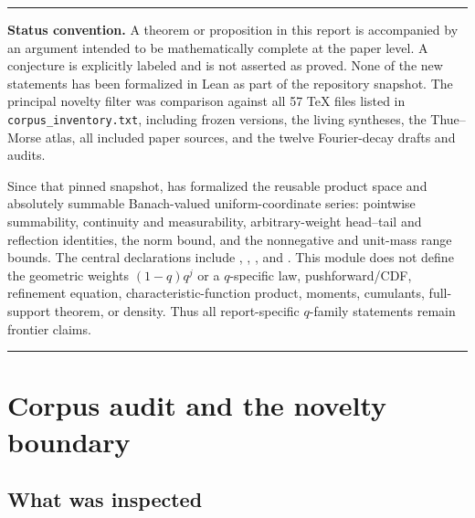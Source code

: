 \documentclass[11pt,oneside]{article}
\theoremstyle{definition}
\theoremstyle{remark}
\newenvironment{boxedremark}{%
  \par\smallskip\noindent\begin{center}\begin{minipage}{0.94\textwidth}%
  \color{black}\hrule\vspace{0.6em}\small
}{%
  \vspace{0.6em}\hrule\end{minipage}\end{center}\smallskip
}
\begin{document}
\begin{boxedremark}
\textbf{Status convention.}
A theorem or proposition in this report is accompanied by an argument intended to be
mathematically complete at the paper level.  A conjecture is explicitly labeled and is not
asserted as proved.  None of the new statements has been formalized in Lean as part of the
repository snapshot.  The principal novelty filter was comparison against all 57 TeX files
listed in \texttt{corpus\_inventory.txt}, including frozen versions, the living syntheses,
the Thue--Morse atlas, all included paper sources, and the twelve Fourier-decay drafts and
audits.

Since that pinned snapshot,  has formalized the reusable
product space and absolutely summable Banach-valued uniform-coordinate series: pointwise
summability, continuity and measurability, arbitrary-weight head--tail and reflection
identities, the norm bound, and the nonnegative and unit-mass range bounds.  The central
declarations include , ,
, and .
This module does not define the geometric weights $(1-q)q^j$ or a $q$-specific law,
pushforward/CDF, refinement equation, characteristic-function product, moments, cumulants,
full-support theorem, or density.  Thus all report-specific $q$-family statements remain
frontier claims.
\end{boxedremark}

\tableofcontents
\newpage

\section{Corpus audit and the novelty boundary}
\label{sec:corpus}

\subsection{What was inspected}
\end{document}
